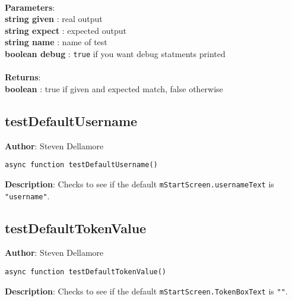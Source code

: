 \documentclass[12pt]{article}
\begin{document}
\textbf{\large{\\Parameters}}:\\
\textbf{string given }: real output\\
\textbf{string expect }: expected output\\
\textbf{string name }: name of test\\
\textbf{boolean debug }: \texttt{true} if you want debug statments printed\\\textbf{\large{\\Returns}}:\\
\textbf{boolean }: true if given and expected match, false otherwise\\

\subsection{testDefaultUsername}
\textbf{Author}: Steven Dellamore 
\vspace*{1\baselineskip}
\begin{lstlisting}
async function testDefaultUsername()
\end{lstlisting} 
\vspace*{1\baselineskip}
\textbf{Description}: Checks to see if the default \texttt{mStartScreen.usernameText} is \texttt{"username"}. 



\subsection{testDefaultTokenValue}
\textbf{Author}: Steven Dellamore 
\vspace*{1\baselineskip}
\begin{lstlisting}
async function testDefaultTokenValue()
\end{lstlisting} 
\vspace*{1\baselineskip}
\textbf{Description}: Checks to see if the default \texttt{mStartScreen.TokenBoxText} is \texttt{""}. 
\end{document}
